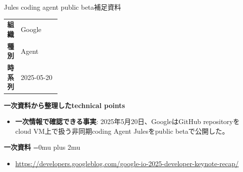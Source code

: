 \begin{technicalnote}{Jules coding agent public beta}{補足資料}
\begingroup
\begin{tabularx}{\linewidth}{@{}>{\bfseries}p{0.22\linewidth}X@{}}
組織 & Google \\
種別 & Agent \\
時系列 & 2025-05-20 \\
\end{tabularx}
\smallskip
\begin{minipage}{\linewidth}
{\bfseries 一次資料から整理したtechnical points}
\begin{itemize}[leftmargin=1.5em,itemsep=0.35em]
\item \textbf{一次情報で確認できる事実}: 2025年5月20日、GoogleはGitHub repositoryをcloud VM上で扱う非同期coding Agent Julesをpublic betaで公開した。
\end{itemize}
\begin{samepage}
{\bfseries 一次資料}
\begingroup\sloppy
\Urlmuskip=0mu plus 2mu\relax
\begin{itemize}[leftmargin=1.5em,itemsep=0.25em]
\item {\scriptsize\url{https://developers.googleblog.com/google-io-2025-developer-keynote-recap/}}
\end{itemize}
\endgroup
\end{samepage}
\end{minipage}
\endgroup
\end{technicalnote}
\medskip


